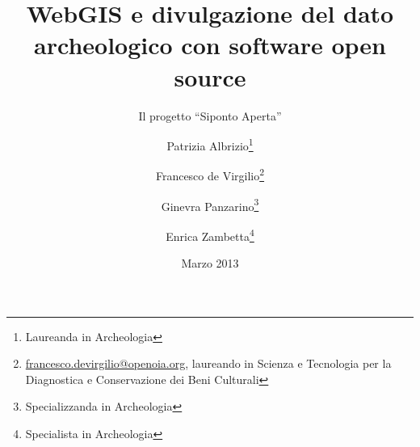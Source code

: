 \documentclass{paper}
\begin{document}

\renewcommand{\nameyeardelim}{, } %

\renewcommand{\bibleftparen}{}
\renewcommand{\bibrightparen}{}

\renewcommand*{\newunitpunct}{\addcomma\space}



\renewcommand*{\mkbibnamelast}[1]{%
    \ifmknamesc{\textsc{#1}}
}


\title{WebGIS e divulgazione del dato archeologico con software open source}

\subtitle{Il progetto ``Siponto Aperta''}

\author{
    \large{Patrizia Albrizio\thanks{Laureanda in Archeologia}}
    \and
    \large{Francesco de Virgilio\thanks{\protect\href{mailto:francesco.devirgilio@openoia.org}{francesco.devirgilio@openoia.org}, laureando in Scienza e Tecnologia per la Diagnostica e Conservazione dei Beni Culturali}}
    \and
    \large{Ginevra Panzarino\thanks{Specializzanda in Archeologia}}
    \and
    \large{Enrica Zambetta\thanks{Specialista in Archeologia}}
}


\date{Marzo 2013}
\vspace{-5cm}
\maketitle
\enlargethispage{5cm}
\end{document}
